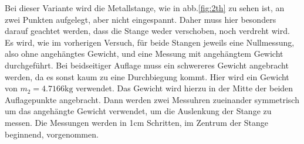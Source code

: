 Bei dieser Variante wird die Metallstange, wie in abb.\ref{fig:2th} zu sehen ist, an zwei Punkten aufgelegt, aber nicht eingespannt. Daher muss 
hier besonders darauf geachtet werden, dass die Stange weder verschoben, noch verdreht wird. Es wird, wie im vorherigen Versuch, für 
beide Stangen jeweils eine Nullmessung, also ohne angehängtes Gewicht, und eine Messung mit angehängtem Gewicht durchgeführt. Bei beidseitiger Auflage muss ein schwereres Gewicht angebracht werden, da es sonst kaum zu eine Durchbiegung kommt. Hier wird ein Gewicht von $m_2 = 4.7166 \si{\kilo\gram}$ verwendet.
Das Gewicht wird hierzu in der Mitte der beiden Auflagepunkte angebracht. Dann werden zwei Messuhren zueinander symmetrisch um das 
angehängte Gewicht verwendet, um die Auslenkung der Stange zu messen. Die Messungen werden in 1$\si{\centi\meter}$ Schritten, im Zentrum 
der Stange beginnend, vorgenommen. 
